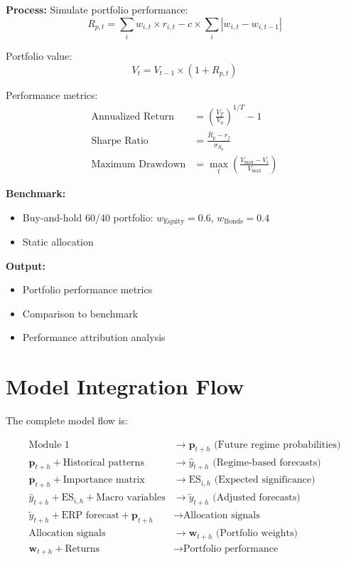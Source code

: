 \documentclass[11pt,a4paper]{article}
\begin{document}
\textbf{Process:}
Simulate portfolio performance:
\begin{equation}
    R_{p,t} = \sum_{i} w_{i,t} \times r_{i,t} - c \times \sum_{i} |w_{i,t} - w_{i,t-1}|
\end{equation}

Portfolio value:
\begin{equation}
    V_t = V_{t-1} \times (1 + R_{p,t})
\end{equation}

Performance metrics:
\begin{align}
    \text{Annualized Return} &= \left(\frac{V_T}{V_0}\right)^{1/T} - 1 \\
    \text{Sharpe Ratio} &= \frac{\bar{R}_p - r_f}{\sigma_{R_p}} \\
    \text{Maximum Drawdown} &= \max_t \left(\frac{V_{\max} - V_t}{V_{\max}}\right)
\end{align}

\textbf{Benchmark:}
\begin{itemize}
    \item Buy-and-hold 60/40 portfolio: $w_{\text{Equity}} = 0.6$, $w_{\text{Bonds}} = 0.4$
    \item Static allocation
\end{itemize}

\textbf{Output:}
\begin{itemize}
    \item Portfolio performance metrics
    \item Comparison to benchmark
    \item Performance attribution analysis
\end{itemize}

\section{Model Integration Flow}

The complete model flow is:

\begin{align}
    \text{Module 1} &\rightarrow \mathbf{p}_{t+h} \text{ (Future regime probabilities)} \\
    \mathbf{p}_{t+h} + \text{Historical patterns} &\rightarrow \hat{y}_{t+h} \text{ (Regime-based forecasts)} \\
    \mathbf{p}_{t+h} + \text{Importance matrix} &\rightarrow \text{ES}_{i,h} \text{ (Expected significance)} \\
    \hat{y}_{t+h} + \text{ES}_{i,h} + \text{Macro variables} &\rightarrow \tilde{y}_{t+h} \text{ (Adjusted forecasts)} \\
    \tilde{y}_{t+h} + \text{ERP forecast} + \mathbf{p}_{t+h} &\rightarrow \text{Allocation signals} \\
    \text{Allocation signals} &\rightarrow \mathbf{w}_{t+h} \text{ (Portfolio weights)} \\
    \mathbf{w}_{t+h} + \text{Returns} &\rightarrow \text{Portfolio performance}
\end{align}
\end{document}
